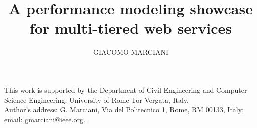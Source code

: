\documentclass[prodmode,gmportfolio]{acmlarge}
\title{A performance modeling showcase for multi-tiered web services}
\author{GIACOMO MARCIANI \affil{University of Rome Tor Vergata}}
\numberwithin{equation}{section}
\begin{document}
	
\begin{bottomstuff}
This work is supported by the Department of Civil Engineering and Computer Science
Engineering, University of Rome Tor Vergata, Italy.\\
Author's address: G. Marciani, Via del Politecnico 1, Rome, RM 00133, Italy;
email: gmarciani@ieee.org.
\end{bottomstuff}

\maketitle


















\elecappendix




\end{document}
